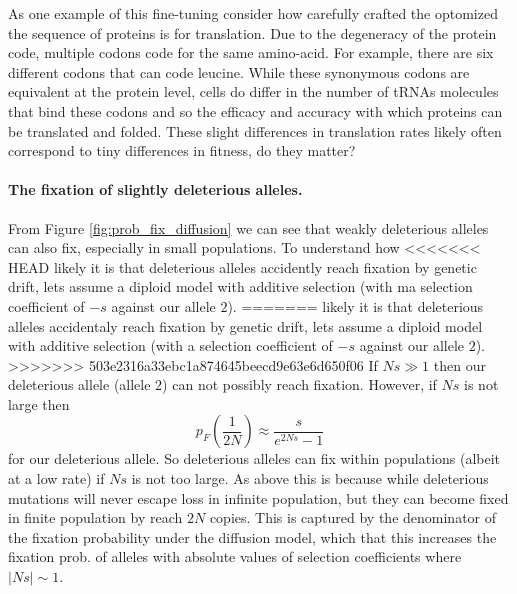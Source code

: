 As one example of this fine-tuning consider how carefully crafted the
optomized the sequence of proteins is for translation. Due to the
degeneracy of the protein code, multiple codons code for the same
amino-acid. For example, there are six different codons that can code
leucine. While these synonymous codons are equivalent at the protein
level, cells do differ in the number of tRNAs molecules that bind
these codons and so the efficacy and accuracy with which proteins can be
translated and folded.  These slight differences in translation rates
likely often correspond to tiny differences in fitness, do they
matter? 


\paragraph{The fixation of slightly deleterious alleles.}
From Figure \ref{fig:prob_fix_diffusion} we can see that weakly
deleterious alleles can also fix, especially in small populations.  To understand how
<<<<<<< HEAD
likely it is that deleterious alleles accidently reach fixation by
genetic drift, lets assume a diploid model with additive selection
(with ma selection coefficient of $-s$ against our allele $2$).  
=======
likely it is that deleterious alleles accidentaly reach fixation by
genetic drift, lets assume a diploid model with additive selection (with
a selection coefficient of $-s$ against our allele $2$).  
>>>>>>> 503e2316a33ebc1a874645beecd9e63e6d650f06
If $N s \gg 1$ then our deleterious allele (allele $2$) can not possibly reach
fixation. However, if $Ns$ is not large then
\begin{equation}
p_F \left( \frac{1}{2N} \right) \approx \frac{s}{e^{2Ns}-1} \label{eqn:fix_deleterious}
\end{equation}
for our deleterious allele. So deleterious alleles can fix within
populations (albeit at a low rate) if $Ns$ is not too large. As above
this is because while deleterious mutations will never escape loss in
infinite population, but they can become fixed in finite population by
reach $2N$ copies. This is captured by the denominator of the fixation
probability under the diffusion model, which that this increases the
fixation prob. of alleles with absolute values of selection
coefficients where $|Ns| \sim 1$.

